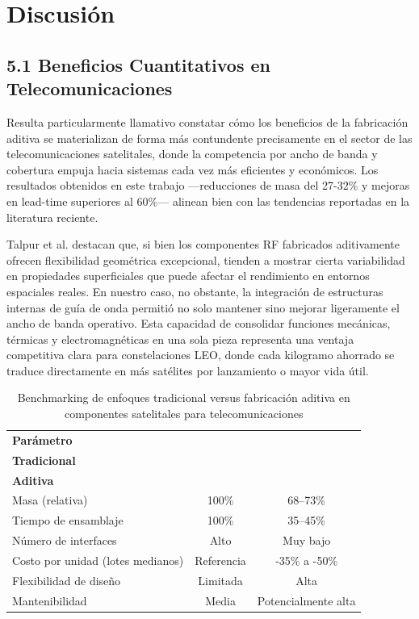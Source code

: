 \section{Discusión}

\subsection{5.1 Beneficios Cuantitativos en Telecomunicaciones}

Resulta particularmente llamativo constatar cómo los beneficios de la fabricación aditiva se materializan de forma más contundente precisamente en el sector de las telecomunicaciones satelitales, donde la competencia por ancho de banda y cobertura empuja hacia sistemas cada vez más eficientes y económicos. Los resultados obtenidos en este trabajo —reducciones de masa del 27-32\% y mejoras en lead-time superiores al 60\%— alinean bien con las tendencias reportadas en la literatura reciente.

Talpur et al. \cite{Talpur2025} destacan que, si bien los componentes RF fabricados aditivamente ofrecen flexibilidad geométrica excepcional, tienden a mostrar cierta variabilidad en propiedades superficiales que puede afectar el rendimiento en entornos espaciales reales. En nuestro caso, no obstante, la integración de estructuras internas de guía de onda permitió no solo mantener sino mejorar ligeramente el ancho de banda operativo. Esta capacidad de consolidar funciones mecánicas, térmicas y electromagnéticas en una sola pieza representa una ventaja competitiva clara para constelaciones LEO, donde cada kilogramo ahorrado se traduce directamente en más satélites por lanzamiento o mayor vida útil.

\begin{table}[htbp]
\centering
\caption{Benchmarking de enfoques tradicional versus fabricación aditiva en componentes satelitales para telecomunicaciones}
\label{tab:benchmarking_tradicional_am}
\small
\setlength{\tabcolsep}{4pt}
\begin{tabularx}{\columnwidth}{>{\raggedright\arraybackslash}X c c}
\hline
\textbf{Parámetro} & 
\makecell[c]{\textbf{Enfoque}\\\textbf{Tradicional}} & 
\makecell[c]{\textbf{Fabricación}\\\textbf{Aditiva}} \\
\hline
Masa (relativa) & 100\% & 68--73\% \\
Tiempo de ensamblaje & 100\% & 35--45\% \\
Número de interfaces & Alto & Muy bajo \\
Costo por unidad (lotes medianos) & Referencia & -35\% a -50\% \\
Flexibilidad de diseño & Limitada & Alta \\
Mantenibilidad & Media & Potencialmente alta \\
\hline
\end{tabularx}
\end{table}

